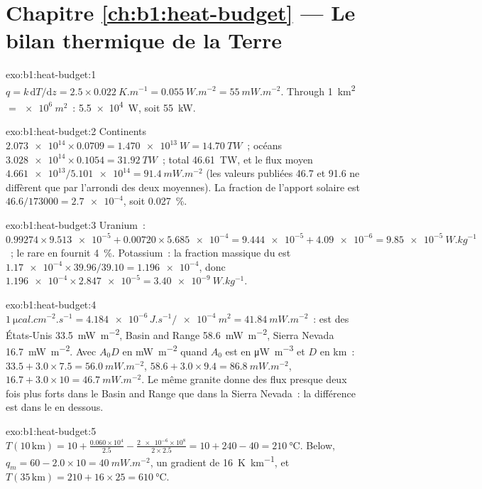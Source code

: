 \section*{Chapitre \ref{ch:b1:heat-budget} --- Le bilan thermique de la Terre}

\begin{solution}{exo:b1:heat-budget:1}
$q = k\,\mathrm dT/\mathrm dz = 2.5\times\qty{0.022}{K.m^{-1}} =
\qty{0.055}{W.m^{-2}} = \qty{55}{mW.m^{-2}}$. Through \qty{1}{km^2} $=
\qty{e6}{m^2}$~: \qty{5.5e4}{W}, soit \qty{55}{kW}.
\end{solution}

\begin{solution}{exo:b1:heat-budget:2}
Continents $\num{2.073e14}\times0.0709 = \qty{1.470e13}{W} = \qty{14.70}{TW}$~;
océans $\num{3.028e14}\times0.1054 = \qty{31.92}{TW}$~; total \qty{46.61}{TW}, et
le flux moyen $\num{4.661e13}/\num{5.101e14} = \qty{91.4}{mW.m^{-2}}$ (les valeurs
publiées 46.7 et 91.6 ne diffèrent que par l'arrondi des deux moyennes). La
fraction de l'apport solaire est $46.6/173000 = \num{2.7e-4}$, soit
\qty{0.027}{\percent}.
\end{solution}

\begin{solution}{exo:b1:heat-budget:3}
Uranium~: $0.99274\times\num{9.513e-5} + 0.00720\times\num{5.685e-4} =
\num{9.444e-5} + \num{4.09e-6} = \qty{9.85e-5}{W.kg^{-1}}$~; le rare
 en fournit \qty{4}{\percent}. Potassium~: la fraction massique du
 est $\num{1.17e-4}\times39.96/39.10 = \num{1.196e-4}$, donc
$\num{1.196e-4}\times\num{2.847e-5} = \qty{3.40e-9}{W.kg^{-1}}$.
\end{solution}

\begin{solution}{exo:b1:heat-budget:4}
$\qty{1}{\micro cal.cm^{-2}.s^{-1}} = \num{4.184e-6}\,\unit{J.s^{-1}}/\qty{e-4}{m^2}
= \qty{41.84}{mW.m^{-2}}$~: est des États-Unis \qty{33.5}{mW.m^{-2}}, Basin and
Range \qty{58.6}{mW.m^{-2}}, Sierra Nevada \qty{16.7}{mW.m^{-2}}. Avec $A_0D$ en
\unit{mW.m^{-2}} quand $A_0$ est en \unit{\micro W.m^{-3}} et $D$ en \unit{km}~:
$33.5 + 3.0\times7.5 = \qty{56.0}{mW.m^{-2}}$, $58.6 + 3.0\times9.4 =
\qty{86.8}{mW.m^{-2}}$, $16.7 + 3.0\times10 = \qty{46.7}{mW.m^{-2}}$. Le même
granite donne des flux presque deux fois plus forts dans le Basin and Range que
dans la Sierra Nevada~: la différence est dans le  en dessous.
\end{solution}

\begin{solution}{exo:b1:heat-budget:5}
$T(10\,\text{km}) = 10 + \frac{0.060\times10^4}{2.5} - \frac{\num{2e-6}\times10^8}{2\times2.5}
= 10 + 240 - 40 = \qty{210}{\degreeCelsius}$. Below, $q_m = 60 - 2.0\times10 =
\qty{40}{mW.m^{-2}}$, un gradient de \qty{16}{K.km^{-1}}, et
$T(35\,\text{km}) = 210 + 16\times25 = \qty{610}{\degreeCelsius}$.
\end{solution}

